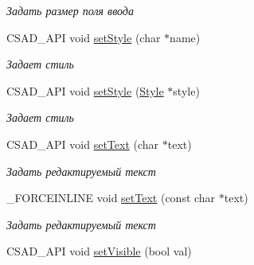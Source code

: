 \begin{DoxyCompactItemize}
\begin{DoxyCompactList}\small\item\em Задать размер поля ввода \end{DoxyCompactList}\item 
\hypertarget{classcsad_1_1_s_g_line_edit_ad5a6c56e6f23e61f2bedc407dd60e7dc}{C\-S\-A\-D\-\_\-\-A\-P\-I void \hyperlink{classcsad_1_1_s_g_line_edit_ad5a6c56e6f23e61f2bedc407dd60e7dc}{set\-Style} (char $\ast$name)}\label{classcsad_1_1_s_g_line_edit_ad5a6c56e6f23e61f2bedc407dd60e7dc}

\begin{DoxyCompactList}\small\item\em Задает стиль \end{DoxyCompactList}\item 
\hypertarget{classcsad_1_1_s_g_line_edit_a637c4873077d232ad97efdc4465d3496}{C\-S\-A\-D\-\_\-\-A\-P\-I void \hyperlink{classcsad_1_1_s_g_line_edit_a637c4873077d232ad97efdc4465d3496}{set\-Style} (\hyperlink{classcsad_1_1_style}{Style} $\ast$style)}\label{classcsad_1_1_s_g_line_edit_a637c4873077d232ad97efdc4465d3496}

\begin{DoxyCompactList}\small\item\em Задает стиль \end{DoxyCompactList}\item 
\hypertarget{classcsad_1_1_s_g_line_edit_a48164102640747bdf5eb008c6e770d48}{C\-S\-A\-D\-\_\-\-A\-P\-I void \hyperlink{classcsad_1_1_s_g_line_edit_a48164102640747bdf5eb008c6e770d48}{set\-Text} (char $\ast$text)}\label{classcsad_1_1_s_g_line_edit_a48164102640747bdf5eb008c6e770d48}

\begin{DoxyCompactList}\small\item\em Задать редактируемый текст \end{DoxyCompactList}\item 
\hypertarget{classcsad_1_1_s_g_line_edit_a86fe803a2cb2f41a06f88813a7ca1d79}{\-\_\-\-F\-O\-R\-C\-E\-I\-N\-L\-I\-N\-E void \hyperlink{classcsad_1_1_s_g_line_edit_a86fe803a2cb2f41a06f88813a7ca1d79}{set\-Text} (const char $\ast$text)}\label{classcsad_1_1_s_g_line_edit_a86fe803a2cb2f41a06f88813a7ca1d79}

\begin{DoxyCompactList}\small\item\em Задать редактируемый текст \end{DoxyCompactList}\item 
\hypertarget{classcsad_1_1_s_g_line_edit_a4e71eeb69a9f032d500e1560bf698b9f}{C\-S\-A\-D\-\_\-\-A\-P\-I void \hyperlink{classcsad_1_1_s_g_line_edit_a4e71eeb69a9f032d500e1560bf698b9f}{set\-Visible} (bool val)}\label{classcsad_1_1_s_g_line_edit_a4e71eeb69a9f032d500e1560bf698b9f}


\end{DoxyCompactItemize}
